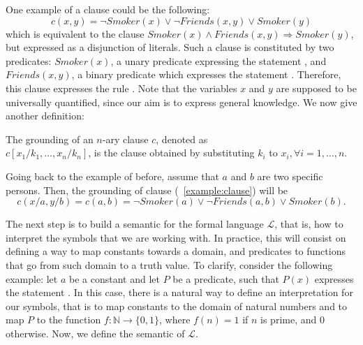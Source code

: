 One example of a clause could be the following: 
\begin{equation}
c(x,y) = \neg Smoker(x) \vee \neg Friends(x,y) \vee Smoker(y)
\label{example:clause}
\end{equation} which is equivalent to the clause $Smoker(x) \wedge Friends(x,y) \Rightarrow Smoker(y)$, but expressed as a disjunction of literals. Such a clause is constituted by two predicates: $Smoker(x)$, a unary predicate expressing the statement , and $Friends(x,y)$, a binary predicate which expresses the statement . Therefore, this clause expresses the rule . Note that the variables $x$ and $y$ are supposed to be universally quantified, since our aim is to express general knowledge. We now give another definition:

\begin{definition}
	The grounding of an $n$-ary clause $c$, denoted as \\ $c[x_1/k_1, \dots, x_n/k_n]$,
	is the clause obtained by substituting $k_i$ to $x_i, \forall i=1,\dots,n$.
\end{definition}

Going back to the example of before, assume that $a$ and $b$ are two specific persons. Then, the grounding of clause (~\ref{example:clause}) will be $$c(x/a, y/b) = c(a,b) = \neg Smoker(a) \vee \neg Friends(a,b) \vee Smoker(b).$$

The next step is to build a semantic for the formal language $\mathcal{L}$, that is, how to interpret the symbols that we are working with. In practice, this will consist on defining a way to map constants towards a domain, and predicates to functions that go from such domain to a truth value. To clarify, consider the following example: let $a$ be a constant and let $P$ be a predicate, such that $P(x)$ expresses the statement . In this case, there is a natural way to define an interpretation for our symbols, that is to map constants to the domain of natural numbers and to map $P$ to the function $f: \mathbb{N}\longrightarrow\{0,1\}$, where $f(n)=1$ if $n$ is prime, and $0$ otherwise. Now, we define the semantic of $\mathcal{L}$.

